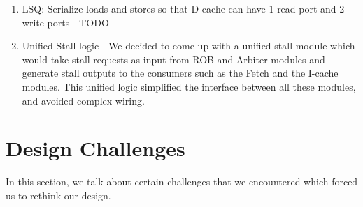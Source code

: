 \documentclass{article}
\begin{document}
\begin{enumerate}
	\item LSQ: Serialize loads and stores so that D-cache can have 1 read
	port and 2 write ports - TODO
	
	\item Unified Stall logic - We decided to come up with a unified stall
	module which would take stall requests as input from ROB and Arbiter
	modules and generate stall outputs to the consumers such as the Fetch
	and the I-cache modules. This unified logic simplified the interface
	between all these modules, and avoided complex wiring.
\end{enumerate}

\section{Design Challenges}
\label{sec:design-chal}
In this section, we talk about certain challenges that we encountered which
forced us to rethink our design. 
\end{document}
